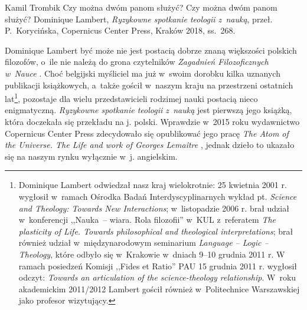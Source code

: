 \begin{recplenv}{Kamil Trombik}
	{Czy można dwóm panom służyć?}
	{Czy można dwóm panom służyć?}
	{Dominique Lambert, \textit{Ryzykowne spotkanie teologii z~nauką}, przeł. P.~Korycińska, Copernicus Center Press, Kraków 2018,
		ss.~268.}




Dominique Lambert być może nie jest postacią dobrze znaną większości polskich filozofów, o~ile nie należą do grona
czytelników \textit{Zagadnień Filozoficznych w~Nauce}
\parencite{lambert_relativites_2005}.
Choć belgijski myśliciel ma już w~swoim dorobku kilka uznanych publikacji książkowych, a~także gościł w~naszym
kraju na przestrzeni ostatnich lat\footnote{Dominique Lambert odwiedzał nasz kraj wielokrotnie: 25 kwietnia 2001 r.
wygłosił w~ramach Ośrodka Badań Interdyscyplinarnych wykład pt. \textit{Science and Theo\-logy: Towards New
Interactions}; w~listopadzie 2006 r. brał udział w~konferencji ,,Nauka~-- wiara. Rola filozofii'' w~KUL z~referatem
\textit{The plasticity of Life. Towards philosophical and theological interpretations}; brał również
udział w~międzynarodowym seminarium \textit{Language  -- Logic -- Theology}, które odbyło się w~Krakowie w~dniach 9–10 grudnia 2011 r.
W ramach posiedzeń Komisji ,,Fides et Ratio'' PAU 15 grudnia 2011 r. wygłosił odczyt: \textit{Towards an articulation of
the science-theology relationship}. W~roku akademickim 2011/2012 Lambert gościł również w~Politechnice Warszawskiej
jako profesor wizytujący. }, pozostaje dla wielu przedstawicieli rodzimej nauki postacią nieco enigmatyczną.
\textit{Ryzykowne spotkanie teologii z~nauką} jest pierwszą jego książką, która doczekała się przekładu na j. polski.
Wprawdzie w~2015 roku wydawnictwo Copernicus Center Press zdecydowało się opublikować jego pracę \textit{The Atom of
the Universe. The Life and work of Georges Lemaître}
\parencite{lambert_atom_2015},
jednak dzieło to
ukazało się na naszym rynku wyłącznie w~j. angielskim. 


\end{recplenv}
